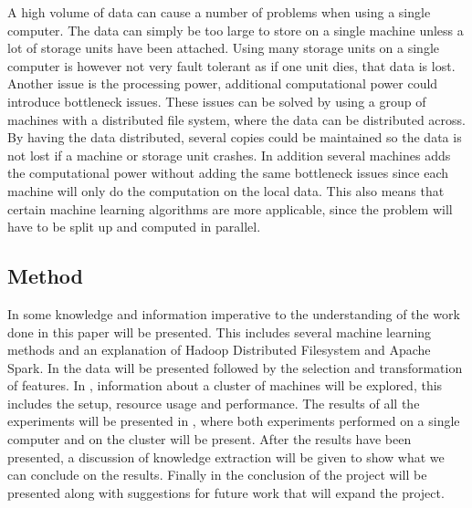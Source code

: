 A high volume of data can cause a number of problems when using a single computer. The data can simply be too large to store on a single machine unless a lot of storage units have been attached. Using many storage units on a single computer is however not very fault tolerant as if one unit dies, that data is lost. Another issue is the processing power, additional computational power could introduce bottleneck issues. These issues can be solved by using a group of machines with a distributed file system, where the data can be distributed across. By having the data distributed, several copies could be maintained so the data is not lost if a machine or storage unit crashes. In addition several machines adds the computational power without adding the same bottleneck issues since each machine will only do the computation on the local data.
This also means that certain machine learning algorithms are more applicable, since the problem will have to be split up and computed in parallel. 

\subsection{Method}
In  some knowledge and information imperative to the understanding of the work done in this paper will be presented. This includes several machine learning methods and an explanation of Hadoop Distributed Filesystem and Apache Spark. In  the data will be presented followed by the selection and transformation of features. In , information about a cluster of machines will be explored, this includes the setup, resource usage and performance. The results of all the experiments will be presented in , where both experiments performed on a single computer and on the cluster will be present. After the results have been presented, a discussion of knowledge extraction will be given to show what we can conclude on the results. Finally in  the conclusion of the project will be presented along with suggestions for future work that will expand the project.





